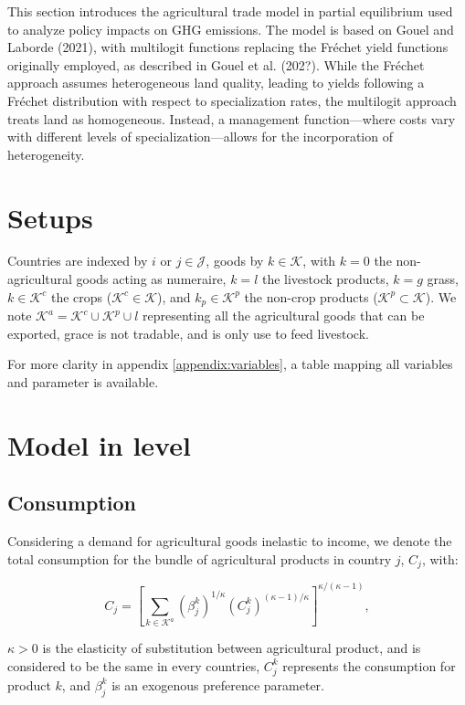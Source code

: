 This section introduces the agricultural trade model in partial equilibrium used to analyze policy impacts on GHG emissions. The model is based on Gouel and Laborde (2021), with multilogit functions replacing the Fréchet yield functions originally employed, as described in Gouel et al. (202?). While the Fréchet approach assumes heterogeneous land quality, leading to yields following a Fréchet distribution with respect to specialization rates, the multilogit approach treats land as homogeneous. Instead, a management function—where costs vary with different levels of specialization—allows for the incorporation of heterogeneity.

\section{Setups}

Countries are indexed by $i$ or $j \in \mathcal{J}$, goods by $k \in \mathcal{K}$, with $k=0$ the non-agricultural goods acting as numeraire, $k = l$ the livestock products, $k = g$ grass, $k \in \mathcal{K}^c$ the crops ($\mathcal{K}^c \in \mathcal{K}$), and $k_p \in \mathcal{K}^p$ the non-crop products ($\mathcal{K}^p \subset \mathcal{K}$). We note $\mathcal{K}^a = \mathcal{K}^c \cup \mathcal{K}^p \cup l$ representing all the agricultural goods that can be exported, grace is not tradable, and is only use to feed livestock.

For more clarity in appendix \ref{appendix:variables}, a table mapping all variables and parameter is available.

\section{Model in level}
\subsection{Consumption}
Considering a demand for agricultural goods inelastic to income, we denote the total consumption for the bundle of agricultural products in country $j$, $C_j$, with:

\begin{equation}
	C_j = \left[ \sum_{k \in \mathcal{K}^a} (\beta_{j}^k)^{1/\kappa} (C_{j}^k)^{(\kappa-1)/\kappa} \right]^{\kappa/(\kappa-1)},
\end{equation}

$\kappa > 0$ is the elasticity of substitution between agricultural product, and is considered to be the same in every countries, $C_j^k$ represents the consumption for product $k$, and $\beta_{j}^k$ is an exogenous preference parameter.

